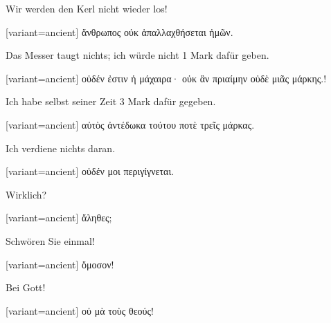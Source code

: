 Wir werden den Kerl nicht wieder los! 

\switchcolumn

\begin{greek}[variant=ancient]%
ἅνθρωπος οὐκ ἀπαλλαχθήσεται ἡμῶν.

\end{greek}%
\switchcolumn*

Das Messer taugt nichts; ich würde nicht 1 Mark dafür geben. 

\switchcolumn

\begin{greek}[variant=ancient]%
οὐδέν ἐστιν ἡ μάχαιρα· οὐκ ἂν πριαίμην οὐδὲ μιᾶς μάρκης.!

\end{greek}%
\switchcolumn*

Ich habe selbst seiner Zeit 3 Mark dafür gegeben. 

\switchcolumn

\begin{greek}[variant=ancient]%
αὐτὸς ἀντέδωκα τούτου ποτὲ τρεῖς μάρκας.

\end{greek}%
\switchcolumn*

Ich verdiene nichts daran. 

\switchcolumn

\begin{greek}[variant=ancient]%
οὐδέν μοι περιγίγνεται.

\end{greek}%
\switchcolumn*

Wirklich? 

\switchcolumn

\begin{greek}[variant=ancient]%
ἄληθες;

\end{greek}%
\switchcolumn*

Schwören Sie einmal! 

\switchcolumn

\begin{greek}[variant=ancient]%
ὄμοσον!

\end{greek}%
\switchcolumn*

Bei Gott! 

\switchcolumn

\begin{greek}[variant=ancient]%
οὐ μὰ τοὺς θεούς!

\end{greek}%
\switchcolumn*

